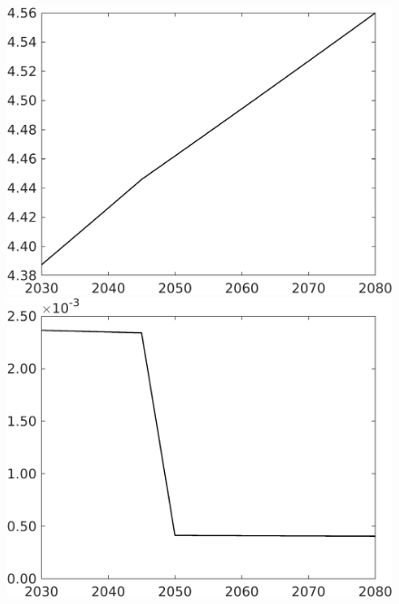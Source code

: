\begin{figure}[h!!]
\begin{minipage}[]{0.32\textwidth}
	\end{minipage}
\begin{minipage}[]{0.32\textwidth}
	\includegraphics[width=1\textwidth]{../../codding_model/own_basedOnFried/optimalPol_elastS_DisuSci/figures/all_1705/Single_OPT_T_NoTaus_An_spillover0_sep1_etaa1.00.png}
\end{minipage}
	\begin{minipage}[]{0.32\textwidth}
	\includegraphics[width=1\textwidth]{../../codding_model/own_basedOnFried/optimalPol_elastS_DisuSci/figures/all_1705/Single_OPT_T_NoTaus_Lf_spillover0_sep1_etaa1.00.png}

\end{minipage}
\end{figure}

